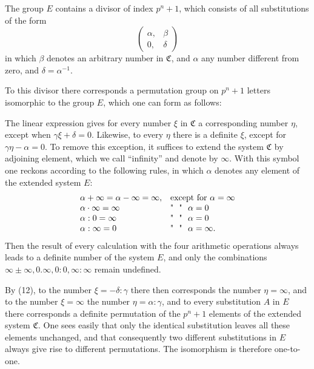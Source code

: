 The group $E$ contains a divisor of index $p^n + 1$, which consists of all substitutions of the form
\[ \begin{pmatrix} \alpha, & \beta \\ 0, & \delta \end{pmatrix} \]
in which $\beta$ denotes an arbitrary number in $\mathfrak{C}$, and $\alpha$ any number different from zero, and $\delta = \alpha^{-1}$.

To this divisor there corresponds a permutation group on $p^n + 1$ letters isomorphic to the group $E$, which one can form as follows:

The linear expression
gives for every number $\xi$ in $\mathfrak{C}$ a corresponding number $\eta$, except when $\gamma\xi + \delta = 0$. Likewise, to every $\eta$ there is a definite $\xi$, except for $\gamma\eta - \alpha = 0$. To remove this exception, it suffices to extend the system $\mathfrak{C}$ by adjoining  element, which we call ``infinity'' and denote by $\infty$. With this symbol one reckons according to the following rules, in which $\alpha$ denotes any element of the extended system $E$:
\[
\begin{array}{l@{\quad}l}
\alpha + \infty = \alpha - \infty = \infty, & \text{except for } \alpha = \infty \\
\alpha \cdot \infty = \infty & \text{\textquotedbl}\ \ \text{\textquotedbl}\ \ \alpha = 0 \\
\alpha : 0 = \infty & \text{\textquotedbl}\ \ \text{\textquotedbl}\ \ \alpha = 0 \\
\alpha : \infty = 0 & \text{\textquotedbl}\ \ \text{\textquotedbl}\ \ \alpha = \infty.
\end{array}
\]
Then the result of every calculation with the four arithmetic operations always leads to a definite number of the system $E$, and only the combinations $\infty \pm \infty, 0 . \infty, 0 : 0, \infty : \infty$ remain undefined.

By (12), to the number $\xi = -\delta : \gamma$ there then corresponds the number $\eta = \infty$, and to the number $\xi = \infty$ the number $\eta = \alpha : \gamma$, and to every substitution $A$ in $E$ there corresponds a definite permutation of the $p^n + 1$ elements of the extended system $\mathfrak{C}$. One sees easily that only the identical substitution leaves all these elements unchanged, and that consequently two different substitutions in $E$ always give rise to different permutations. The isomorphism is therefore one-to-one.
